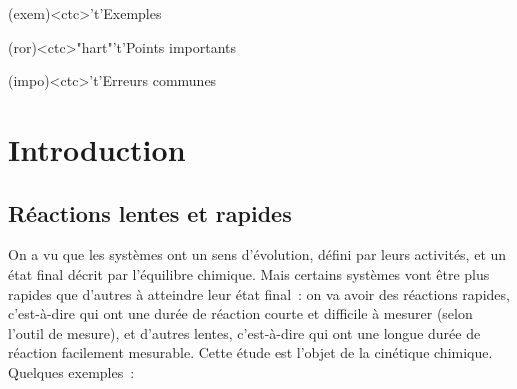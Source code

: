 \documentclass[../../main/main.tex]{subfiles}
\begin{document}
\begin{tcn}[%
		sidebyside, fontupper=\small, fontlower=\small
	]
	\begin{tcn}[nsp](exem)<ctc>'t'{Exemples}
		\vspace{-25pt}
	\end{tcn}
	\begin{tcn}[nsp](ror)<ctc>"hart"'t'{Points importants}
		\vspace{-25pt}
	\end{tcn}
	\begin{tcn}[nsp](impo)<ctc>'t'{Erreurs communes}
		\vspace{-25pt}
	\end{tcn}
\end{tcn}
\vspace{-15pt}
\vspace*{\fill}
\newpage

\section{Introduction}
\subsection{Réactions lentes et rapides}

On a vu que les systèmes ont un sens d'évolution, défini par leurs activités, et
un état final décrit par l'équilibre chimique. Mais certains systèmes vont être
plus rapides que d'autres à atteindre leur état final~: on va avoir des
réactions rapides, c'est-à-dire qui ont une durée de réaction courte et
difficile à mesurer (selon l'outil de mesure), et d'autres lentes, c'est-à-dire
qui ont une longue durée de réaction facilement mesurable. Cette étude est
l'objet de la cinétique chimique. Quelques exemples~:
\end{document}
